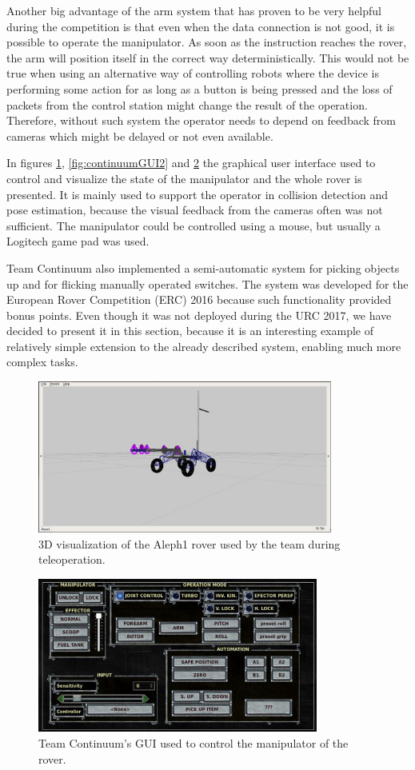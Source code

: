\documentclass[runningheads,a4paper]{llncs}
\begin{document}
Another big advantage of the arm system that has proven to be very helpful during the competition is that even when the data connection is not good, it is possible to operate the manipulator. As soon as the instruction reaches the rover, the arm will position itself in the correct way deterministically. This would not be true when using an alternative way of controlling robots where the device is performing some action for as long as a button is being pressed and the loss of packets from the control station might change the result of the operation. Therefore, without such system the operator needs to depend on feedback from cameras which might be delayed or not even available. 

In figures \ref{fig:continuumGUI1}, \ref{fig:continuumGUI2} and \ref{fig:continuumGUI3} the graphical user interface used to control and visualize the state of the manipulator and the whole rover is presented. It is mainly used to support the operator in collision detection and pose estimation, because the visual feedback from the cameras often was not sufficient. The manipulator could be controlled using a mouse, but usually a Logitech game pad was used.

Team Continuum also implemented a semi-automatic system for picking objects up and for flicking manually operated switches. The system was developed for the European Rover Competition (ERC) 2016 because such functionality provided bonus points. Even though it was not deployed during the URC 2017, we have decided to present it in this section, because it is an interesting example of relatively simple extension to the already described system, enabling much more complex tasks.

\begin{figure}
\centering
\includegraphics[height=5cm]{continuumGUI1}
\caption{3D visualization of the Aleph1 rover used by the team during teleoperation.}
\label{fig:continuumGUI1}
\end{figure}

\begin{figure}
\centering
\includegraphics[width=9.2cm]{continuumGUI3}
\caption{Team Continuum's GUI used to control the manipulator of the rover.}
\label{fig:continuumGUI3}
\end{figure}
  
\end{document}
